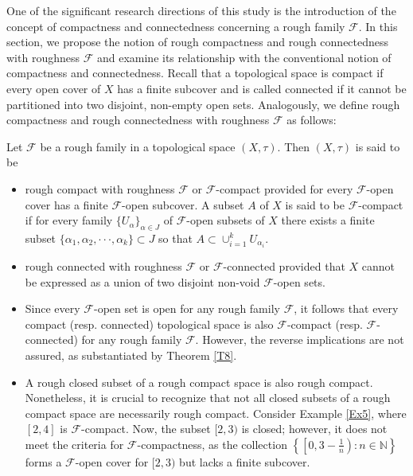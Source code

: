 \documentclass[11pt]{amsart}
\begin{document}
One of the significant research directions of this study is the introduction of the concept of compactness and connectedness concerning a rough family $\mathscr{F}$. In this section, we propose the notion of rough compactness and rough connectedness with roughness $\mathscr{F}$ and examine its relationship with the conventional notion of compactness and connectedness. Recall that a topological space is compact if every open cover of $X$ has a finite subcover and is called connected if it cannot be partitioned into two disjoint, non-empty open sets.  Analogously, we define rough compactness and rough connectedness with roughness $\mathscr{F}$ as follows:
\begin{definition}
    Let $\mathscr{F}$ be a rough family in a topological space $(X,\tau)$. Then $(X,\tau)$ is said to be 
    
    \begin{itemize}
        \item rough compact with roughness $\mathscr{F}$ or $\mathscr{F}$-compact provided for every $\mathscr{F}$-open cover has a finite  $\mathscr{F}$-open subcover. A subset $A$ of $X$ is said to be $\mathscr{F}$-compact if for every family $\{U_\alpha\}_{\alpha\in J}$ of $\mathscr{F}$-open subsets of $X$  there exists a finite subset $\{\alpha_1,\alpha_2,\cdot\cdot\cdot,\alpha_k\}\subset J$ so that $A\subset\cup^{k}_{i=1}U_{\alpha_i}.$
  
    \item rough connected with roughness $\mathscr{F}$ or $\mathscr{F}$-connected provided that $X$ cannot be expressed as a union of two disjoint non-void $\mathscr{F}$-open sets.
    \end{itemize}\end{definition}


\begin{remark}
\begin{itemize}
    \item[(i)] Since every $\mathscr{F}$-open set is open for any rough family $\mathscr{F}$, it follows that every compact (resp. connected) topological space is also $\mathscr{F}$-compact (resp. $\mathscr{F}$-connected) for any rough family $\mathscr{F}$. 
    However, the reverse implications are not assured, as substantiated by Theorem \ref{T8}.

    \item[(ii)] A rough closed subset of a rough compact space is also rough compact. Nonetheless, it is crucial to recognize that not all closed subsets of a rough compact space are necessarily rough compact. Consider Example \ref{Ex5}, where $[2,4]$ is $\mathscr{F}$-compact. Now, the subset $[2,3)$ is closed; however, it does not meet the criteria for $\mathscr{F}$-compactness, as the collection $\left\{\left[0,3-\frac{1}{n}\right): n\in \mathbb{N}\right\}$ forms a $\mathscr{F}$-open cover for $[2,3)$ but lacks a finite subcover.
\end{itemize}
   
\end{remark}
\end{document}
